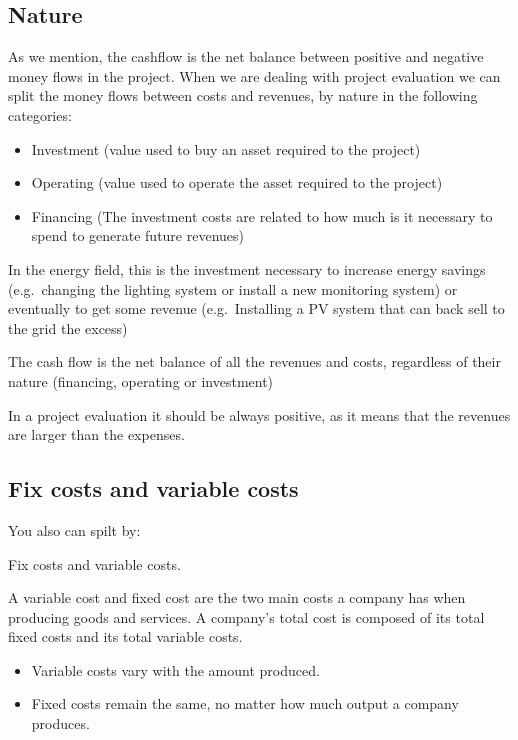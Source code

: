 \documentclass[]{book}
\providecommand{\tightlist}{%
  \setlength{\itemsep}{0pt}\setlength{\parskip}{0pt}}
\theoremstyle{definition}
\theoremstyle{definition}
\theoremstyle{definition}
\theoremstyle{remark}
\begin{document}
\subsection{Nature}\label{nature}

As we mention, the cashflow is the net balance between positive and
negative money flows in the project. When we are dealing with project
evaluation we can split the money flows between costs and revenues, by
nature in the following categories:

\begin{itemize}
\tightlist
\item
  Investment (value used to buy an asset required to the project)
\item
  Operating (value used to operate the asset required to the project)
\item
  Financing (The investment costs are related to how much is it
  necessary to spend to generate future revenues)
\end{itemize}

In the energy field, this is the investment necessary to increase energy
savings (e.g.~changing the lighting system or install a new monitoring
system) or eventually to get some revenue (e.g.~Installing a PV system
that can back sell to the grid the excess)

The cash flow is the net balance of all the revenues and costs,
regardless of their nature (financing, operating or investment)

In a project evaluation it should be always positive, as it means that
the revenues are larger than the expenses.

\subsection{Fix costs and variable
costs}\label{fix-costs-and-variable-costs}

You also can spilt by:

Fix costs and variable costs.

A variable cost and fixed cost are the two main costs a company has when
producing goods and services. A company's total cost is composed of its
total fixed costs and its total variable costs.

\begin{itemize}
\item
  Variable costs vary with the amount produced.
\item
  Fixed costs remain the same, no matter how much output a company
  produces.
\end{itemize}
\end{document}
